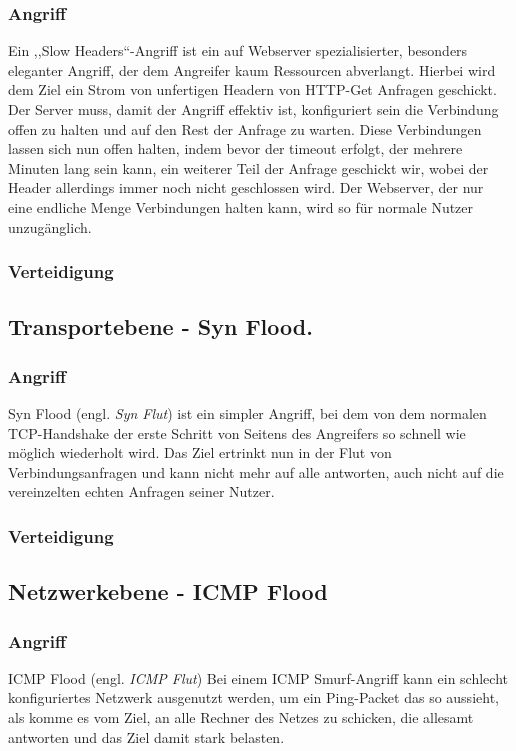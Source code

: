 \documentclass[12pt,a4paper]{article}
\begin{document}
\subsubsection*{Angriff}
Ein ,,Slow Headers``-Angriff ist ein auf Webserver spezialisierter, besonders eleganter Angriff, der dem Angreifer kaum Ressourcen abverlangt. Hierbei wird dem Ziel ein Strom von unfertigen Headern von HTTP-Get Anfragen geschickt. Der Server muss, damit der Angriff effektiv ist, konfiguriert sein die Verbindung offen zu halten und auf den Rest der Anfrage zu warten. Diese Verbindungen lassen sich nun offen halten, indem bevor der timeout erfolgt, der mehrere Minuten lang sein kann, ein weiterer Teil der Anfrage geschickt wir, wobei der Header allerdings immer noch nicht geschlossen wird. Der Webserver, der nur eine endliche Menge Verbindungen halten kann, wird so für normale Nutzer unzugänglich.
\subsubsection*{Verteidigung}
\subsection{Transportebene - Syn Flood.}
\subsubsection*{Angriff}
Syn Flood (engl. \textit{Syn Flut}) ist ein simpler Angriff, bei dem von dem normalen TCP-Handshake der erste Schritt von Seitens des Angreifers so schnell wie möglich wiederholt wird. Das Ziel ertrinkt nun in der Flut von Verbindungsanfragen und kann nicht mehr auf alle antworten, auch nicht auf die vereinzelten echten Anfragen seiner Nutzer.
\subsubsection*{Verteidigung}
\subsection{Netzwerkebene - ICMP Flood}
\subsubsection*{Angriff}
ICMP Flood (engl. \textit{ICMP Flut}) Bei einem ICMP Smurf-Angriff kann ein schlecht konfiguriertes Netzwerk ausgenutzt werden, um ein Ping-Packet das so aussieht, als komme es vom Ziel, an alle Rechner des Netzes zu schicken, die allesamt antworten und das Ziel damit stark belasten.
\end{document}
